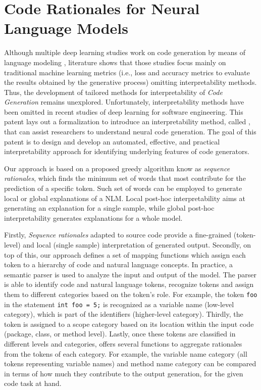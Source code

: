 \chapter{Code Rationales for \break Neural Language Models}
\label{ch8:rationales}

Although multiple deep learning studies work on code generation by means of language modeling \cite{Cruz-Benito}, literature shows that those studies focus mainly on traditional machine learning metrics  (i.e., loss and accuracy metrics to evaluate the results obtained by the generative process) omitting interpretability methods. Thus, the development of tailored methods for interpretability of \textit{Code Generation} remains unexplored. Unfortunately, interpretability methods have been omitted in recent studies of deep learning for software engineering. This patent lays out a formalization to introduce an interpretability method, called \codeSeqRational, that can assist researchers to understand neural code generation. The goal of this patent is to design and develop an automated, effective, and practical interpretability approach for identifying underlying features of code generators. 

Our approach \codeSeqRational is based on a proposed greedy algorithm know as \textit{sequence rationales}\citep{vafa2021rationales}, which finds the minimum set of words that most contribute for the prediction of a specific token. Such set of words can be employed to generate local or global explanations of a NLM. Local post-hoc interpretability aims at generating an explanation for a single sample, while global post-hoc interpretability generates explanations for a whole model. 

Firstly, \textit{Sequence rationales} adapted to source code provide a fine-grained (token-level) and local (single sample) interpretation of generated output. Secondly, on top of this, our approach defines a set of mapping functions which assign each token to a hierarchy of code and natural language concepts. In practice, a semantic parser is used to analyze the input and output of the model. The parser is able to identify code and natural language tokens, recognize tokens and assign them to different categories based on the token's role. For example, the token \texttt{foo} in the statement \texttt{int foo = 5;} is recognized as a variable name (low-level category), which is part of the identifiers (higher-level category). Thirdly, the token is assigned to a scope category based on its location within the input code (\eg package, class, or method level). Lastly, once these tokens are classified in different levels and categories, \codeSeqRational offers several functions to aggregate rationales from the tokens of each category. For example, the variable name category (\ie all tokens representing variable names) and method name category can be compared in terms of how much they contribute to the output generation, for the given code task at hand.

